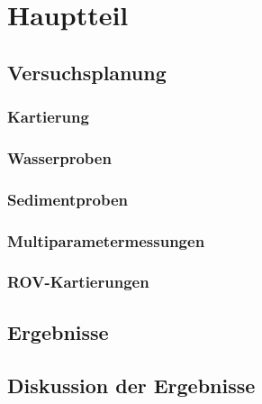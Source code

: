  

\chapter[Hauptteil]{Hauptteil}

\section{Versuchsplanung}

\subsection{Kartierung}
    
    
\subsection{Wasserproben}
\subsection{Sedimentproben}
\subsection{Multiparametermessungen}
\subsection{ROV-Kartierungen}

\section{Ergebnisse}
\section{Diskussion der Ergebnisse}

